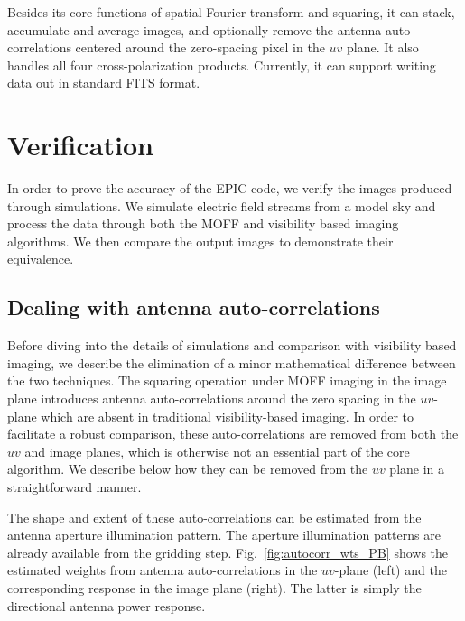 \documentclass[a4paper,fleqn,usenatbib]{../mnras}
\begin{document}
Besides its core functions of spatial Fourier transform and squaring, it can 
stack, accumulate and average images, and optionally remove the antenna
auto-correlations centered around the zero-spacing pixel in the $uv$ plane. 
It also handles all four cross-polarization products. Currently, it can 
support writing data out in standard FITS format. 

\section{Verification}\label{sec:verify}

In order to prove the accuracy of the EPIC code, we verify the images produced 
through simulations. We simulate electric field streams from a model sky and 
process the data through both the MOFF and visibility based imaging algorithms. 
We then compare the output images to demonstrate their equivalence.

\subsection{Dealing with antenna auto-correlations}\label{sec:rm-autocorr}

Before diving into the details of simulations and comparison with visibility 
based imaging, we describe the elimination of a minor mathematical difference 
between the two techniques. The squaring operation under MOFF imaging in the 
image plane introduces antenna auto-correlations around the zero spacing in 
the $uv$-plane which are absent in traditional visibility-based imaging. In 
order to facilitate a robust comparison, these auto-correlations are removed 
from both the $uv$ and image planes, which is otherwise not an essential part 
of the core algorithm. We describe below how they can be removed from the $uv$ 
plane in a straightforward manner. 

The shape and extent of these auto-correlations can be estimated from the 
antenna aperture illumination pattern. The aperture illumination patterns
are already available from the gridding step. Fig.~\ref{fig:autocorr_wts_PB} 
shows the estimated weights from antenna auto-correlations in the $uv$-plane 
(left) and the corresponding response in the image plane (right). The latter 
is simply the directional antenna power response. 
\end{document}
